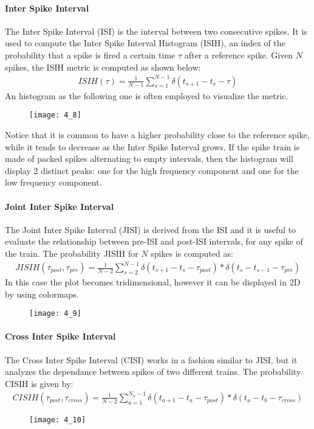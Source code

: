 \paragraph{Inter Spike Interval}
The Inter Spike Interval (ISI) is the interval between two consecutive spikes. It is used to compute
the Inter Spike Interval Histogram (ISIH), an index of the probability that a spike is fired
a certain time \(\tau\) after a reference spike.
Given \(N\) spikes, the ISIH metric is computed as shown below:
\begin{align*}
    ISIH(\tau)=\frac{1}{N-1}\sum_{s=1}^{N-1}\delta{(t_{s+1}-t_{s}-\tau)}
\end{align*}
An histogram as the following one is often employed to visualize the metric.
\begin{figure}[H]
    \texttt{[image: 4\_8]}
    \centering
\end{figure}
Notice that it is common to have a higher probability close to the reference spike, while it tends to
decrease as the Inter Spike Interval grows. If the spike train is made of packed spikes alternating
to empty intervals, then the histogram will display 2 distinct peaks: one for the high frequency
component and one for the low frequency component.
\paragraph{Joint Inter Spike Interval}
The Joint Inter Spike Interval (JISI) is derived from the ISI and it is useful to evaluate the
relationship between pre-ISI and post-ISI intervals, for any spike of the train.
The probability JISIH for \(N\) spikes is computed as:
\begin{align*}
    JISIH(\tau_{post},\tau_{pre})=\frac{1}{N-2}\sum_{s=2}^{N-1}\delta{(t_{s+1}-t_{s}-\tau_{post})}\ast \delta{(t_s-t_{s-1}-\tau_{pre})}
\end{align*}
In this case the plot becomes tridimensional, however it can be displayed in 2D by using
colormaps.
\begin{figure}[H]
    \texttt{[image: 4\_9]}
    \centering
\end{figure}
\paragraph{Cross Inter Spike Interval}
The Cross Inter Spike Interval (CISI) works in a fashion similar to JISI, but it analyzes the
dependance between spikes of two different trains. The probability CISIH is given by:
\begin{align*}
    CISIH(\tau_{post},\tau_{cross})=\frac{1}{N-2}\sum_{a=1}^{N_a-1}\delta{(t_{a+1}-t_{a}-\tau_{post})}\ast \delta{(t_a-t_b-\tau_{cross})}
\end{align*}
\begin{figure}[H]
    \texttt{[image: 4\_10]}
    \centering
\end{figure}